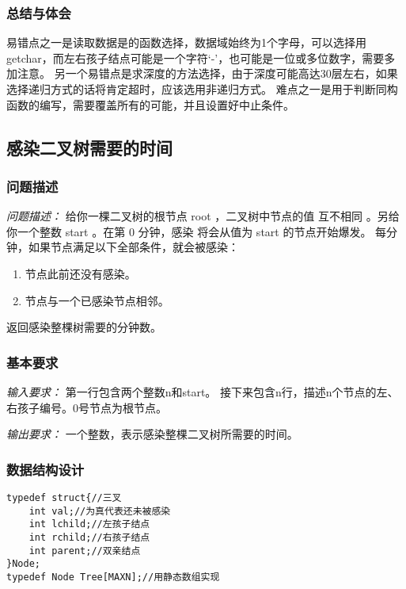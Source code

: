 \documentclass[a4paper,11pt]{article}%
\newenvironment{shadedquotation}
 {\begin{shaded*}
  \quoting[leftmargin=0pt, vskip=0pt]
 }
 {\endquoting
 \end{shaded*}
}
\begin{document}
\subsubsection{总结与体会}
易错点之一是读取数据是的函数选择，数据域始终为1个字母，可以选择用getchar，而左右孩子结点可能是一个字符‘-’，也可能是一位或多位数字，需要多加注意。
另一个易错点是求深度的方法选择，由于深度可能高达30层左右，如果选择递归方式的话将肯定超时，应该选用非递归方式。
难点之一是用于判断同构函数的编写，需要覆盖所有的可能，并且设置好中止条件。
\subsection{感染二叉树需要的时间}
\subsubsection{问题描述}
\begin{shadedquotation}
    \emph{问题描述：}
    给你一棵二叉树的根节点 root ，二叉树中节点的值 互不相同 。另给你一个整数 start 。在第 0 分钟，感染 将会从值为 start 的节点开始爆发。
每分钟，如果节点满足以下全部条件，就会被感染：
\begin{enumerate}
    \item 节点此前还没有感染。
    \item 节点与一个已感染节点相邻。
\end{enumerate}
返回感染整棵树需要的分钟数。
\end{shadedquotation}
\subsubsection{基本要求}
\begin{shadedquotation}
    \emph{输入要求：}
    第一行包含两个整数n和start。
接下来包含n行，描述n个节点的左、右孩子编号。0号节点为根节点。
\end{shadedquotation}
\begin{shadedquotation}
    \emph{输出要求：}
    一个整数，表示感染整棵二叉树所需要的时间。
\end{shadedquotation}
\subsubsection{数据结构设计}
\begin{lstlisting}[language={[ANSI]C},keywordstyle=\color{blue!70},commentstyle=\color{red!50!green!50!blue!50},frame=shadowbox,
				rulesepcolor=\color{red!20!green!20!blue!20}]
typedef struct{//三叉
	int val;//为真代表还未被感染
	int lchild;//左孩子结点
	int rchild;//右孩子结点
	int parent;//双亲结点
}Node;
typedef Node Tree[MAXN];//用静态数组实现
\end{lstlisting}
\end{document}
